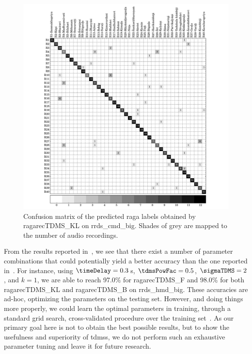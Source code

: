 \begin{figure}[h]
	\begin{center}
		\includegraphics[width=\figSizeNinety]{ch07_ragaRecognition/figures/CM_tdms_cmd_var1.pdf}
	\end{center}
	\caption[Confusion matrix of classification results by \acrshort{ragarecTDMS_KL} on \acrshort{rrds_cmd_big}]{Confusion matrix of the predicted \gls{raga} labels obtained by \acrshort{ragarecTDMS_KL} on \acrshort{rrds_cmd_big}. Shades of grey are mapped to the number of audio recordings.} 
	\label{confusion_mtx_carnatic_tdms}
\end{figure}

From the results reported in~, we see that there exist a number of parameter combinations that could potentially yield a better accuracy than the one reported in~. For instance, using  $\timeDelay=0.3$\,s, $\tdmsPowFac=0.5$, $\sigmaTDMS=2$, and $k=1$, we are able to reach 97.0\% for \acrshort{ragarecTDMS_F} and 98.0\% for both \acrshort{ragarecTDMS_KL} and \acrshort{ragarecTDMS_B} on \acrshort{rrds_hmd_big}. These accuracies are ad-hoc, optimizing the parameters on the testing set. However, and doing things more properly, we could learn the optimal parameters in training, through a standard grid search, cross-validated procedure over the training set~\cite{Mitchell97BOOK}. As our primary goal here is not to obtain the best possible results, but to show the usefulness and superiority of \glspl{tdms}, we do not perform such an exhaustive parameter tuning and leave it for future research.

